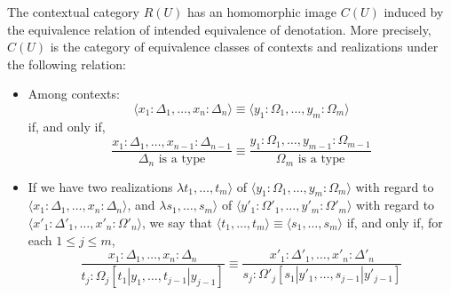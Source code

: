 The contextual category $R(U)$ has an homomorphic image $C(U)$
induced by the equivalence relation of intended equivalence of denotation.
More precisely, $C(U)$ is the category of equivalence classes
of contexts and realizations under the following relation:
\begin{itemize}
    \item Among contexts:
        \begin{equation*}
            \langle x_1 : \Delta_1, \dots, x_n : \Delta_n \rangle
            \equiv
            \langle y_1 : \Omega_1, \dots, y_m : \Omega_m \rangle
        \end{equation*}
        if, and only if,
        \begin{equation*}
            \dfrac{
                x_1 : \Delta_1, \dots, x_{n-1} : \Delta_{n-1}
            }{
                \Delta_n \text{ is a type}
            }
            \equiv
            \dfrac{
                y_1 : \Omega_1, \dots, y_{m-1} : \Omega_{m-1}
            }{
                \Omega_m \text{ is a type}
            }
        \end{equation*}
    \item If we have two realizations 
    $\lambda t_1, \dots, t_m \rangle$ of $\langle y_1 : \Omega_1, \dots, y_m : \Omega_m \rangle$
    with regard to $\langle x_1 : \Delta_1, \dots, x_n : \Delta_n \rangle$, and
    $\lambda s_1, \dots, s_m \rangle$ of $\langle y'_1 : \Omega'_1, \dots, y'_m : \Omega'_m \rangle$
    with regard to $\langle x'_1 : \Delta'_1, \dots, x'_n : \Omega'_n \rangle$,
    we say that $\langle t_1, \dots, t_m \rangle \equiv \langle s_1, \dots, s_m \rangle$
    if, and only if, for each $1 \leq j \leq m$,
    \begin{equation*}
        \dfrac{
            x_1 : \Delta_1, \dots, x_n : \Delta_n
        }{
            t_j : \Omega_j[t_1 | y_1, \dots, t_{j-1} | y_{j-1}]
        }
        \equiv
        \dfrac{
            x'_1 : \Delta'_1, \dots, x'_n : \Delta'_n
        }{
            s_j : \Omega'_j[s_1 | y'_1, \dots, s_{j-1} | y'_{j-1}]
        }
    \end{equation*}
\end{itemize}

